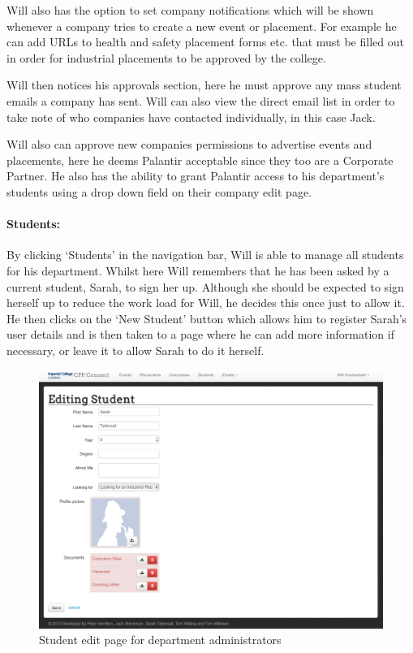     Will also has the option to set company notifications which will be shown whenever a company tries to create a new event or placement. For example he can add URLs to health and safety placement forms etc. that must be filled out in order for industrial placements to be approved by the college. 

    Will then notices his approvals section, here he must approve any mass student emails a company has sent. Will can also view the direct email list in order to take note of who companies have contacted individually, in this case Jack.

    Will also can approve new companies permissions to advertise events and placements, here he deems Palantir acceptable since they too are a Corporate Partner. He also has the ability to grant Palantir access to his department's students using a drop down field on their company edit page.

  \paragraph{Students:}
    By clicking `Students' in the navigation bar, Will is able to manage all students for his department.
    Whilst here Will remembers that he has been asked by a current student, Sarah, to sign her up. Although she should be expected to sign herself up to reduce the work load for Will, he decides this once just to allow it.
    He then clicks on the `New Student' button which allows him to register Sarah's user details and is then taken to a page where he can add more information if necessary, or leave it to allow Sarah to do it herself.
    \begin{figure}[H]\centering
    \includegraphics[scale=0.3]{images/user_experiences/admin/admin_student_edit}
    \caption{Student edit page for department administrators}
    \end{figure}

